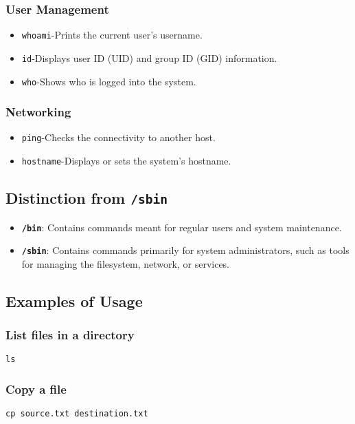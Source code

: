\subsubsection*{User Management}
\begin{itemize}
    \item \texttt{whoami}-Prints the current user's username.
    \item \texttt{id}-Displays user ID (UID) and group ID (GID) information.
    \item \texttt{who}-Shows who is logged into the system.
\end{itemize}

\subsubsection*{Networking}
\begin{itemize}
    \item \texttt{ping}-Checks the connectivity to another host.
    \item \texttt{hostname}-Displays or sets the system's hostname.
\end{itemize}

\subsection*{Distinction from \texttt{/sbin}}

\begin{itemize}
    \item \textbf{\texttt{/bin}}: Contains commands meant for regular users and system maintenance.
    \item \textbf{\texttt{/sbin}}: Contains commands primarily for system administrators, such as tools for managing the filesystem, network, or services.
\end{itemize}

\subsection*{Examples of Usage}

\subsubsection*{List files in a directory}
\begin{lstlisting}
ls
\end{lstlisting}

\subsubsection*{Copy a file}
\begin{lstlisting}
cp source.txt destination.txt
\end{lstlisting}


